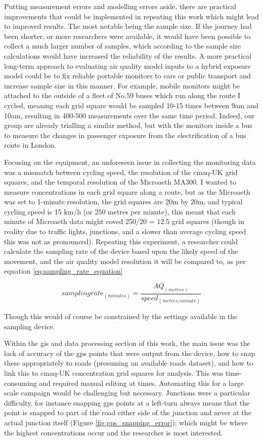 Putting measurement errors and modelling errors aside, there are practical improvements that could be implemented in repeating this work which might lead to improved results. The most notable being the sample size. If the journey had been shorter, or more researchers were available, it would have been possible to collect a much larger number of samples, which according to the sample size calculations would have increased the reliability of the results. A more practical long-term approach to evaluating air quality model inputs to a hybrid exposure model could be to fix reliable portable monitors to cars or public transport and increase sample size in this manner. For example, mobile monitors might be attached to the outside of a fleet of No.59 buses which run along the route I cycled, meaning each grid square would be sampled 10-15 times between 9am and 10am, resulting in 400-500 measurements over the same time period. Indeed, our group are already trialling a similar method, but with the monitors inside a bus to measure the changes in passenger exposure from the electrification of a bus route in London.

Focusing on the equipment, an unforeseen issue in collecting the monitoring data was a mismatch between cycling speed, the resolution of the \gls{cmaq}-UK grid squares, and the temporal resolution of the Microaeth MA300. I wanted to measure concentrations in each grid square along a route, but as the Microaeth was set to 1-minute resolution, the grid squares are 20m by 20m, and typical cycling speed is 15 km/h (or 250 metres per minute), this meant that each minute of Microaeth data might coved 250/20 = 12.5 grid squares (though in reality due to traffic lights, junctions, and a slower than average cycling speed this was not as pronounced). Repeating this experiment, a researcher could calculate the sampling rate of the device based upon the likely speed of the movement, and the air quality model resolution it will be compared to, as per equation \ref{eq:sampling_rate_equation}

\begin{equation}
  sampling rate_{(minutes)} = \frac{AQ_{(metres)}}{speed_{(metres/minute)}}
  \label{eq:sampling_rate_equation}
\end{equation}

Though this would of course be constrained by the settings available in the sampling device.

Within the \gls{gis} and data processing section of this work, the main issue was the lack of accuracy of the \gls{gps} points that were output from the device, how to snap these appropriately to roads (presuming an available roads dataset), and how to link this to \gls{cmaq}-UK concentration grid squares for analysis. This was time-consuming and required manual editing at times. Automating this for a large scale campaign would be challenging but necessary. Junctions were a particular difficulty, for instance snapping \gls{gps} points at a left-turn always means that the point is snapped to part of the road either side of the junction and never at the actual junction itself (Figure \ref{fig:gps_snapping_error}); which might be where the highest concentrations occur and the researcher is most interested.

